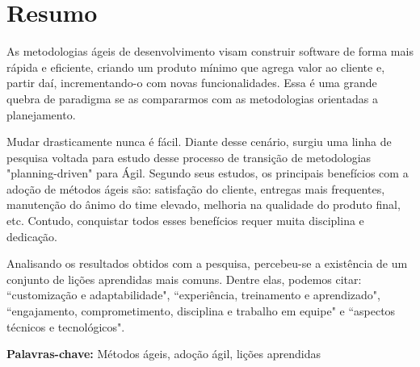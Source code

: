 \chapter*{Resumo}

As metodologias ágeis de desenvolvimento visam construir software de forma mais rápida e eficiente, criando um produto mínimo que agrega valor ao cliente e, partir daí, incrementando-o com novas funcionalidades. Essa é uma grande quebra de paradigma se as compararmos com as metodologias orientadas a planejamento.

Mudar drasticamente nunca é fácil. Diante desse cenário, surgiu uma linha de pesquisa voltada para estudo desse processo de transição de metodologias "planning-driven" para Ágil. Segundo seus estudos, os principais benefícios com a adoção de métodos ágeis são: satisfação do cliente, entregas mais frequentes, manutenção do ânimo do time elevado, melhoria na qualidade do produto final, etc. Contudo, conquistar todos esses benefícios requer muita disciplina e dedicação.

Analisando os resultados obtidos com a pesquisa, percebeu-se a existência de um conjunto de lições aprendidas mais comuns. Dentre elas, podemos citar: ``customização e adaptabilidade", ``experiência, treinamento e aprendizado", ``engajamento, comprometimento, disciplina e trabalho em equipe" e ``aspectos técnicos e tecnológicos".

\textbf{Palavras-chave:} Métodos ágeis, adoção ágil, lições aprendidas
